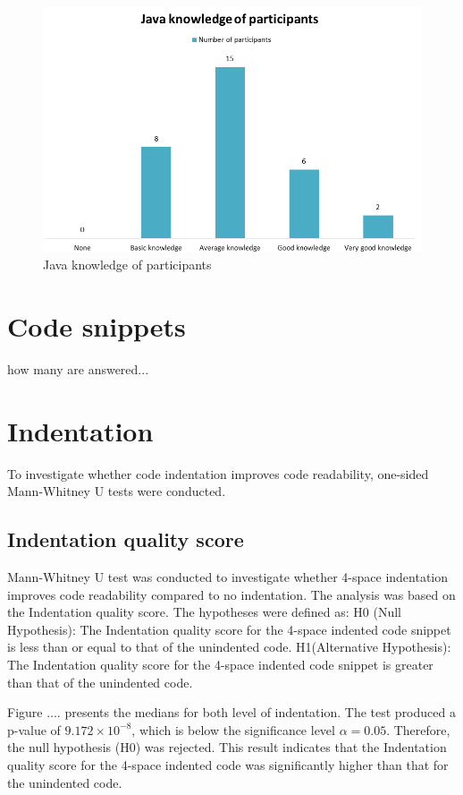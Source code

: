 \begin{figure} [H]
  \centering
  \includegraphics[scale=0.8]{figures/java_kn.png}
  \caption{Java knowledge of participants}
  \label{fig:AnhangsChor}
\end{figure}


\section{Code snippets}
how many are answered...

\section{Indentation}
To investigate whether code indentation improves code readability, one-sided Mann-Whitney U tests were conducted. 



\subsection{Indentation quality score}


Mann-Whitney U test was conducted to investigate whether 4-space indentation improves code readability compared to no indentation. The analysis was based on the Indentation quality score. The hypotheses were defined as:  H0 (Null Hypothesis): The Indentation quality score for the 4-space indented code snippet is less than or equal to that of the unindented code. H1(Alternative Hypothesis): The Indentation quality score for the 4-space indented code snippet is greater than that of the unindented code.

Figure .... presents the medians for both level of indentation. The test produced a p-value of \(9.172 \times 10^{-8}\), which is below the significance level \(\alpha = 0.05\). Therefore, the null hypothesis (H0) was rejected. This result indicates that the Indentation quality score for the 4-space indented code was significantly higher than that for the unindented code. 

